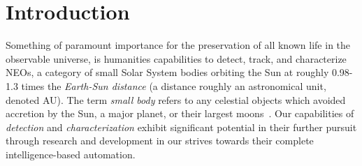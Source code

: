 \chapter{Introduction}

Something of paramount importance for the preservation of all known life in the
observable universe, is humanities capabilities to detect, track, and
characterize \glspl{NEO}, a category of small Solar System bodies orbiting the
Sun at roughly 0.98-1.3 times the \textit{Earth-Sun distance} (a distance
roughly an astronomical unit, denoted AU). The term \textit{small body} refers
to any celestial objects which avoided accretion by the Sun, a major planet, or
their largest moons~\cite{Davidsson2021}. Our capabilities of \textit{detection}
and \textit{characterization} exhibit significant potential in their further
pursuit through research and development in our strives towards their complete    %
intelligence-based automation.

